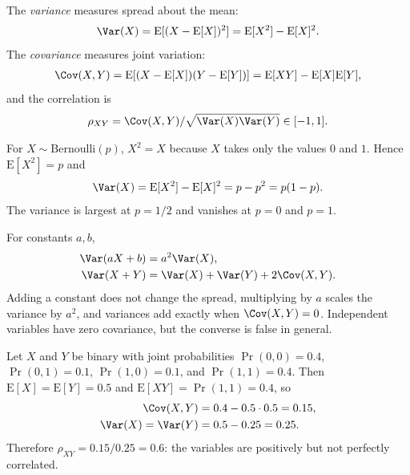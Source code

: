 \documentclass[a4paper, 12pt]{book}
\begin{document}
\begin{definition}
    The \emph{variance} measures spread about the mean:
\begin{align}
    \Var(X) = \mathrm{E}[(X - \mathrm{E}[X])^2] = \mathrm{E}[X^2] - \mathrm{E}[X]^2.
\end{align}
The \emph{covariance} measures joint variation:
\begin{align}
    \Cov(X,Y) = \mathrm{E}[(X-\mathrm{E}[X])(Y-\mathrm{E}[Y])] = \mathrm{E}[XY] - \mathrm{E}[X]\mathrm{E}[Y],
\end{align}
and the correlation is 
\begin{align}
    \rho_{XY} = \Cov(X,Y)/\sqrt{\Var(X)\Var(Y)} \in [-1,1].
\end{align}
\end{definition}
\begin{example}
    For $X\sim\mathrm{Bernoulli}(p)$, $X^2=X$ because $X$ takes only the values
    $0$ and $1$. Hence $\mathrm{E}[X^2]=p$ and
    \begin{align}
        \Var(X) = \mathrm{E}[X^2]-\mathrm{E}[X]^2 = p-p^2 = p(1-p).
    \end{align}
    The variance is largest at $p=1/2$ and vanishes at $p=0$ and $p=1$.
\end{example}

\begin{example}
    For constants $a,b$,
    \begin{align}
        \Var(aX+b) &= a^2\Var(X),\\
        \Var(X+Y) &= \Var(X)+\Var(Y)+2\Cov(X,Y).
    \end{align}
    Adding a constant does not change the spread, multiplying by $a$ scales the
    variance by $a^2$, and variances add exactly when $\Cov(X,Y)=0$. Independent
    variables have zero covariance, but the converse is false in general.
\end{example}

\begin{example}
    Let $X$ and $Y$ be binary with joint probabilities
    $\Pr(0,0)=0.4$, $\Pr(0,1)=0.1$, $\Pr(1,0)=0.1$, and $\Pr(1,1)=0.4$. Then
    $\mathrm{E}[X]=\mathrm{E}[Y]=0.5$ and $\mathrm{E}[XY]=\Pr(1,1)=0.4$, so
    \begin{align}
        \Cov(X,Y) &= 0.4-0.5\cdot0.5 = 0.15,\\
        \Var(X)=\Var(Y) &= 0.5-0.25 = 0.25.
    \end{align}
    Therefore $\rho_{XY}=0.15/0.25=0.6$: the variables are positively but not
    perfectly correlated.
\end{example}
\end{document}
